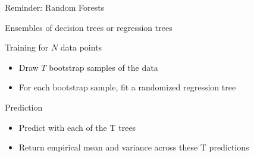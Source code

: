 \begin{frame}[c]{Reminder: Random Forests}

Ensembles of decision trees or regression trees

Training for $N$ data points
\begin{itemize}
  	\item Draw $T$ \alert{bootstrap samples} of the data
  	\item For each bootstrap sample, fit a \alert{randomized} regression tree
\end{itemize}
  
Prediction
\begin{itemize}
  	\item Predict with each of the T trees
  	\item Return \alert{empirical mean and variance} across these T predictions
\end{itemize}
\end{frame}
% 
% 
% 
% 
% 
% 


